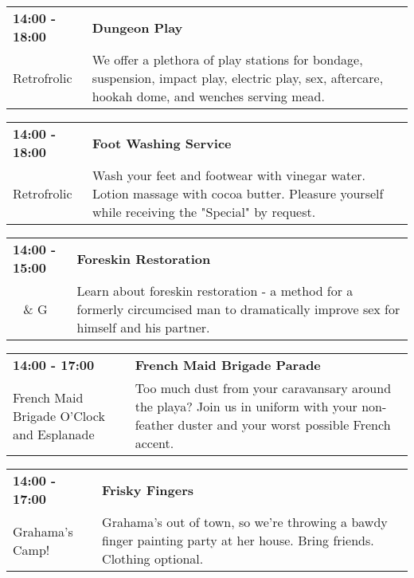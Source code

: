 \begin{tabular}{ p{1in} p{2.2in} }
    \textbf{14:00 - 18:00} & \textbf{Dungeon Play} \\
    Retrofrolic \newline  & We offer a plethora of play stations for bondage, suspension, impact play, electric play, sex, aftercare, hookah dome, and wenches serving mead. \\
    \hline 
\end{tabular}
    
\begin{tabular}{ p{1in} p{2.2in} }
    \textbf{14:00 - 18:00} & \textbf{Foot Washing Service} \\
    Retrofrolic \newline  & Wash your feet and footwear with vinegar water.  Lotion massage with cocoa butter. Pleasure yourself while receiving the "Special" by request. \\
    \hline 
\end{tabular}
    
\begin{tabular}{ p{1in} p{2.2in} }
    \textbf{14:00 - 15:00} & \textbf{Foreskin Restoration } \\
    ~ \newline 9 \& G & Learn about foreskin restoration - a method for a formerly circumcised man to dramatically improve sex for himself and his partner. \\
    \hline 
\end{tabular}
    
\begin{tabular}{ p{1in} p{2.2in} }
    \textbf{14:00 - 17:00} & \textbf{French Maid Brigade Parade} \\
    French Maid Brigade \newline 3 O'Clock and Esplanade & Too much dust from your caravansary around the playa? Join us in uniform with your non-feather duster and your worst possible French accent. \\
    \hline 
\end{tabular}
    
\begin{tabular}{ p{1in} p{2.2in} }
    \textbf{14:00 - 17:00} & \textbf{Frisky Fingers} \\
    Grahama's Camp! \newline  & Grahama's out of town, so we're throwing a bawdy finger painting party at her house. Bring friends. Clothing optional. \\
    \hline 
\end{tabular}
    
